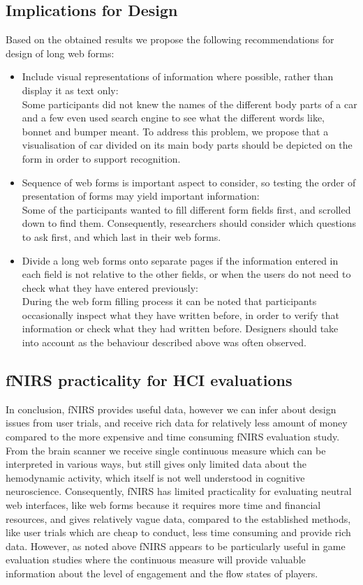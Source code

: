 \documentclass[../main/Replicate.tex]{subfiles}
\begin{document}
	\subsection{Implications for Design}
	Based on the obtained results we propose the following recommendations for design of long web forms:
	\begin{itemize}
		\item Include visual representations of information where possible, rather than display it as text only:\\
		Some participants did not knew the names of the different body parts of a car and a few even used search engine to see what the different words like, bonnet and bumper meant. To address this problem, we propose that a visualisation of car divided on its main body parts should be depicted on the form in order to support recognition.
		
		\item Sequence of web forms is important aspect to consider, so testing the order of presentation of forms may yield important information:\\
		Some of the participants wanted to fill different form fields first, and scrolled down to find them. Consequently, researchers should consider which questions to ask first, and which last in their web forms.
		
		\item Divide a long web forms onto separate pages if the information entered in each field is not relative to the other fields, or when the users do not need to check what they have entered previously:\\
		During the web form filling process it can be noted that participants occasionally inspect what they have written before, in order to verify that information or check what they had written before. Designers should take into account as the behaviour described above was often observed.
	\end{itemize}
	
	\subsection{fNIRS practicality for HCI evaluations}	
	In conclusion, fNIRS provides useful data, however we can infer about design issues from user trials, and receive rich data for relatively less amount of money compared to the more expensive and time consuming fNIRS evaluation study. From the brain scanner we receive single continuous measure which can be interpreted in various ways, but still gives only limited data about the hemodynamic activity, which itself is not well understood in cognitive neuroscience. Consequently, fNIRS has limited practicality for evaluating neutral web interfaces, like web forms because it requires more time and financial resources, and gives relatively vague data, compared to the established methods, like user trials which are cheap to conduct, less time consuming and provide rich data. However, as noted above fNIRS appears to be particularly useful in game evaluation studies where the continuous measure will provide valuable information about the level of engagement\cite{harrivel2013monitoring} and the flow states\cite{yoshida2014brain} of players.	
	
\end{document}
